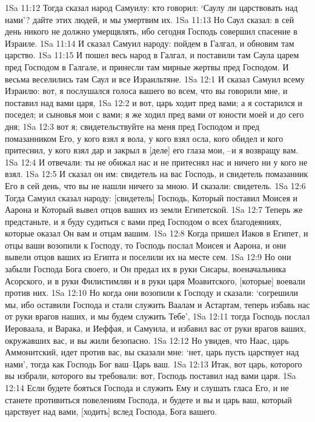 1Sa 11:12  Тогда сказал народ Самуилу: кто говорил: `Саулу ли царствовать над нами'? дайте этих людей, и мы умертвим их.
1Sa 11:13  Но Саул сказал: в сей день никого не должно умерщвлять, ибо сегодня Господь совершил спасение в Израиле.
1Sa 11:14  И сказал Самуил народу: пойдем в Галгал, и обновим там царство.
1Sa 11:15  И пошел весь народ в Галгал, и поставили там Саула царем пред Господом в Галгале, и принесли там мирные жертвы пред Господом. И весьма веселились там Саул и все Израильтяне.
1Sa 12:1  И сказал Самуил всему Израилю: вот, я послушался голоса вашего во всем, что вы говорили мне, и поставил над вами царя,
1Sa 12:2  и вот, царь ходит пред вами; а я состарился и поседел; и сыновья мои с вами; я же ходил пред вами от юности моей и до сего дня;
1Sa 12:3  вот я; свидетельствуйте на меня пред Господом и пред помазанником Его, у кого взял я вола, у кого взял осла, кого обидел и кого притеснил, у кого взял дар и закрыл в [деле] его глаза мои, --и я возвращу вам.
1Sa 12:4  И отвечали: ты не обижал нас и не притеснял нас и ничего ни у кого не взял.
1Sa 12:5  И сказал он им: свидетель на вас Господь, и свидетель помазанник Его в сей день, что вы не нашли ничего за мною. И сказали: свидетель.
1Sa 12:6  Тогда Самуил сказал народу: [свидетель] Господь, Который поставил Моисея и Аарона и Который вывел отцов ваших из земли Египетской.
1Sa 12:7  Теперь же предстаньте, и я буду судиться с вами пред Господом о всех благодеяниях, которые оказал Он вам и отцам вашим.
1Sa 12:8  Когда пришел Иаков в Египет, и отцы ваши возопили к Господу, то Господь послал Моисея и Аарона, и они вывели отцов ваших из Египта и поселили их на месте сем.
1Sa 12:9  Но они забыли Господа Бога своего, и Он предал их в руки Сисары, военачальника Асорского, и в руки Филистимлян и в руки царя Моавитского, [которые] воевали против них.
1Sa 12:10  Но когда они возопили к Господу и сказали: `согрешили мы, ибо оставили Господа и стали служить Ваалам и Астартам, теперь избавь нас от руки врагов наших, и мы будем служить Тебе',
1Sa 12:11  тогда Господь послал Иероваала, и Варака, и Иеффая, и Самуила, и избавил вас от руки врагов ваших, окружавших вас, и вы жили безопасно.
1Sa 12:12  Но увидев, что Наас, царь Аммонитский, идет против вас, вы сказали мне: `нет, царь пусть царствует над нами', тогда как Господь Бог ваш--Царь ваш.
1Sa 12:13  Итак, вот царь, которого вы избрали, которого вы требовали: вот, Господь поставил над вами царя.
1Sa 12:14  Если будете бояться Господа и служить Ему и слушать гласа Его, и не станете противиться повелениям Господа, и будете и вы и царь ваш, который царствует над вами, [ходить] вслед Господа, Бога вашего.
